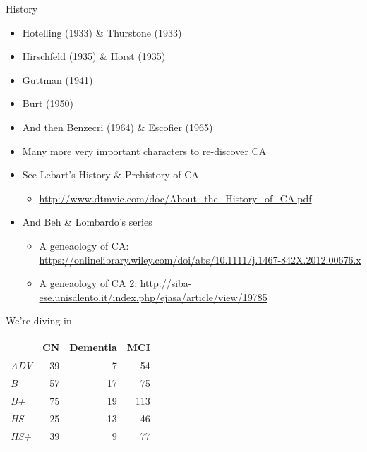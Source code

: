 \documentclass[
  ignorenonframetext,
]{beamer}
\providecommand{\tightlist}{%
  \setlength{\itemsep}{0pt}\setlength{\parskip}{0pt}}
\begin{document}
\begin{frame}{History}
\protect\hypertarget{history}{}

\begin{itemize}[<+->]
\tightlist
\item
  Hotelling (1933) \& Thurstone (1933)
\item
  Hirschfeld (1935) \& Horst (1935)
\item
  Guttman (1941)
\item
  Burt (1950)
\item
  And then Benzecri (1964) \& Escofier (1965)
\item
  Many more very important characters to re-discover CA
\end{itemize}

\end{frame}

\begin{frame}

\begin{itemize}[<+->]
\tightlist
\item
  See Lebart's History \& Prehistory of CA

  \begin{itemize}[<+->]
  \tightlist
  \item
    \url{http://www.dtmvic.com/doc/About_the_History_of_CA.pdf}
  \end{itemize}
\item
  And Beh \& Lombardo's series

  \begin{itemize}[<+->]
  \tightlist
  \item
    A geneaology of CA:
    \url{https://onlinelibrary.wiley.com/doi/abs/10.1111/j.1467-842X.2012.00676.x}
  \item
    A geneaology of CA 2:
    \url{http://siba-ese.unisalento.it/index.php/ejasa/article/view/19785}
  \end{itemize}
\end{itemize}

\end{frame}

\begin{frame}{We're diving in}
\protect\hypertarget{were-diving-in}{}

\begin{table}[H]
\centering
\begin{tabular}{>{\em}lrrr}
\toprule
  & CN & Dementia & MCI\\
\midrule
ADV & 39 & 7 & 54\\
B & 57 & 17 & 75\\
B+ & 75 & 19 & 113\\
HS & 25 & 13 & 46\\
HS+ & 39 & 9 & 77\\
\bottomrule
\end{tabular}
\end{table}

\end{frame}
\end{document}
